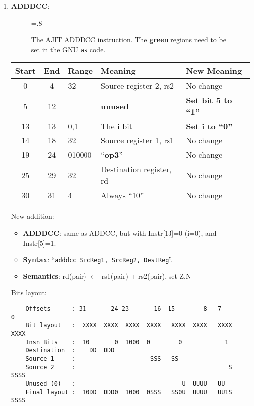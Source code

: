 \begin{enumerate}
\item \textbf{ADDDCC}:\\
  \begin{center}
    \begin{figure}[h]
      \centering
      \epsfxsize=.8\linewidth
      \caption{The   AJIT   ADDDCC   instruction.    The   {\darkgreen
          {\textbf{green}}}  regions  need  to   be  set  in  the  GNU
        \texttt{as} code.}
      \label{fig:ajit:adddcc:insn}
    \end{figure}
    \begin{tabular}[p]{|c|c|l|l|l|}
      \hline
      \textbf{Start} & \textbf{End} & \textbf{Range} & \textbf{Meaning} &
                                                                          \textbf{New Meaning}\\
      \hline
      0 & 4 & 32 & Source register 2, rs2 & No change \\
      5 & 12 & -- & \textbf{unused} & \textbf{Set bit 5 to ``1''} \\
      13 & 13 & 0,1 & The \textbf{i} bit & \textbf{Set i to ``0''} \\
      14 & 18 & 32 & Source register 1, rs1 & No change \\
      19 & 24 & 010000 & ``\textbf{op3}'' & No change \\
      25 & 29 & 32 & Destination register, rd & No change \\
      30 & 31 & 4 & Always ``10'' & No change \\
      \hline
    \end{tabular}
  \end{center}
  New addition:
  \begin{itemize}
  \item []\textbf{ADDDCC}: same as ADDCC, but with Instr[13]=0 (i=0), and
    Instr[5]=1.
  \item []\textbf{Syntax}: ``\texttt{adddcc  SrcReg1, SrcReg2, DestReg}''.
  \item []\textbf{Semantics}: rd(pair) $\leftarrow$ rs1(pair) + rs2(pair), set Z,N
  \end{itemize}
  Bits layout:
\begin{verbatim}
    Offsets      : 31       24 23       16  15        8   7        0
    Bit layout   :  XXXX  XXXX  XXXX  XXXX   XXXX  XXXX   XXXX  XXXX
    Insn Bits    :  10       0  1000  0        0            1       
    Destination  :    DD  DDD                                       
    Source 1     :                     SSS   SS
    Source 2     :                                           S  SSSS
    Unused (0)   :                              U  UUUU   UU        
    Final layout :  10DD  DDD0  1000  0SSS   SS0U  UUUU   UU1S  SSSS
\end{verbatim}


\end{enumerate}
